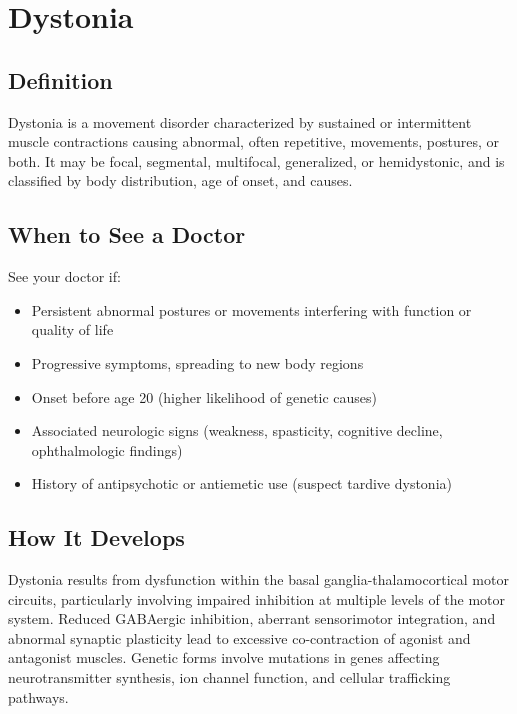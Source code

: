 \chapter{Dystonia}

\section*{Definition}
Dystonia is a movement disorder characterized by sustained or intermittent muscle contractions causing abnormal, often repetitive, movements, postures, or both. It may be focal, segmental, multifocal, generalized, or hemidystonic, and is classified by body distribution, age of onset, and causes.

\section*{When to See a Doctor}
See your doctor if:
\begin{itemize}
  \item Persistent abnormal postures or movements interfering with function or quality of life
  \item Progressive symptoms, spreading to new body regions
  \item Onset before age 20 (higher likelihood of genetic causes)
  \item Associated neurologic signs (weakness, spasticity, cognitive decline, ophthalmologic findings)
  \item History of antipsychotic or antiemetic use (suspect tardive dystonia)
\end{itemize}

\section*{How It Develops}
Dystonia results from dysfunction within the basal ganglia-thalamocortical motor circuits, particularly involving impaired inhibition at multiple levels of the motor system. Reduced GABAergic inhibition, aberrant sensorimotor integration, and abnormal synaptic plasticity lead to excessive co-contraction of agonist and antagonist muscles. Genetic forms involve mutations in genes affecting neurotransmitter synthesis, ion channel function, and cellular trafficking pathways.

